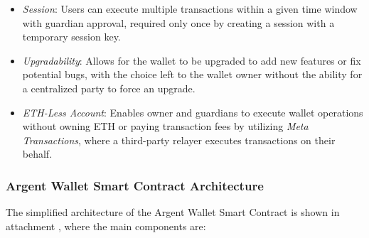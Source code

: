 \begin{itemize}
    \item \textit{Session}: Users can execute multiple transactions within a given time window with guardian approval, required only once by creating a session with a temporary session key.
    \item \textit{Upgradability}: Allows for the wallet to be upgraded to add new features or fix potential bugs, with the choice left to the wallet owner without the ability for a centralized party to force an upgrade.
    \item \textit{ETH-Less Account}: Enables owner and guardians to execute wallet operations without owning ETH or paying transaction fees by utilizing \textit{Meta Transactions}, where a third-party relayer executes transactions on their behalf.
    \end{itemize}
    
\subsubsection{Argent Wallet Smart Contract Architecture}

The simplified architecture of the Argent Wallet Smart Contract is shown in attachment , where the main components are: \cite{argent-smart-wallet-specifications}


